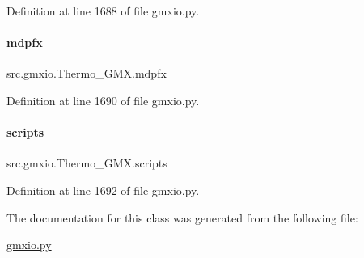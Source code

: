 Definition at line 1688 of file gmxio.\+py.

\mbox{\label{classsrc_1_1gmxio_1_1Thermo__GMX_aceb73e3767c11d6fae3aa6412dd63c59}} 
\paragraph{\texorpdfstring{mdpfx}{mdpfx}}
{\footnotesize\ttfamily src.\+gmxio.\+Thermo\+\_\+\+G\+M\+X.\+mdpfx}



Definition at line 1690 of file gmxio.\+py.

\mbox{\label{classsrc_1_1gmxio_1_1Thermo__GMX_ad5ee6853eb28b23b3110f6ed984bf779}} 
\paragraph{\texorpdfstring{scripts}{scripts}}
{\footnotesize\ttfamily src.\+gmxio.\+Thermo\+\_\+\+G\+M\+X.\+scripts}



Definition at line 1692 of file gmxio.\+py.



The documentation for this class was generated from the following file\+:\begin{DoxyCompactItemize}
\item 
\hyperlink{gmxio_8py}{gmxio.\+py}\end{DoxyCompactItemize}
